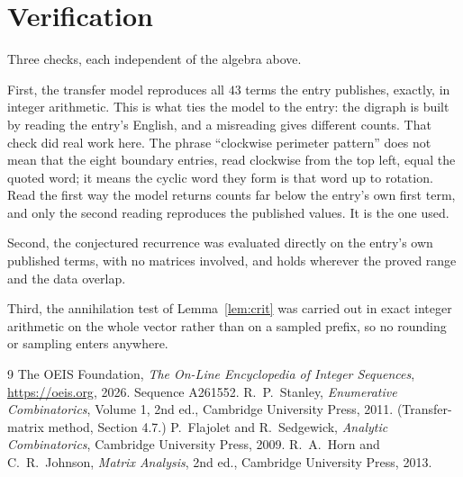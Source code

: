 \documentclass[11pt,a4paper]{article}
\theoremstyle{plain}
\theoremstyle{definition}
\begin{document}
\section{Verification}

Three checks, each independent of the algebra above.

First, the transfer model reproduces all $43$ terms the entry publishes, exactly, in
integer arithmetic. This is what ties the model to the entry: the digraph is built by reading
the entry's English, and a misreading gives different counts. That check did real work here. The phrase ``clockwise perimeter pattern'' does not mean that the eight boundary entries, read clockwise from the top left, equal the quoted word; it means the cyclic word they form is that word up to rotation. Read the first way the model returns counts far below the entry's own first term, and only the second reading reproduces the published values. It is the one used.

Second, the conjectured recurrence was evaluated directly on the entry's own published terms,
with no matrices involved, and holds wherever the proved range and the data overlap.

Third, the annihilation test of Lemma~\ref{lem:crit} was carried out in exact integer
arithmetic on the whole vector rather than on a sampled prefix, so no rounding or sampling
enters anywhere.

\begin{thebibliography}{9}
 The OEIS Foundation, \emph{The On-Line Encyclopedia of Integer
Sequences}, \url{https://oeis.org}, 2026. Sequence A261552.
 R.~P.~Stanley, \emph{Enumerative Combinatorics}, Volume 1, 2nd ed.,
Cambridge University Press, 2011. (Transfer-matrix method, Section 4.7.)
 P.~Flajolet and R.~Sedgewick, \emph{Analytic Combinatorics}, Cambridge
University Press, 2009.
 R.~A.~Horn and C.~R.~Johnson, \emph{Matrix Analysis}, 2nd ed., Cambridge
University Press, 2013.
\end{thebibliography}
\end{document}
